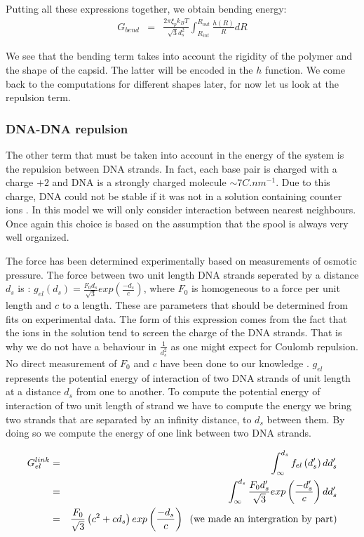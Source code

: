 \documentclass{article}
\begin{document}
Putting all these expressions together, we obtain bending energy:
\begin{eqnarray}
    G_{bend} &=& \frac{2 \pi \xi_p k_B T}{\sqrt{3} d_s^2} \int_{R_{int}}^{R_{out}} \frac{h(R)}{R} dR
\end{eqnarray}

We see that the bending term takes into account the rigidity of the polymer and the shape of the capsid. The latter will be encoded in the $h$ function. We come back to the computations for different shapes later, for now let us look at the repulsion term.

\subsubsection{DNA-DNA repulsion}

The other term that must be taken into account in the energy of the system is the repulsion between DNA strands. In fact, each base pair is charged with a charge $+2$ \cite{alberts2002} and DNA is a strongly charged molecule $ \sim 7 C.nm^{-1} $. Due to this charge, DNA could not be stable if it was not in a solution containing counter ions \cite{singh2015}. In this model we will only consider interaction between nearest neighbours. Once again this choice is based on the assumption that the spool is always very well organized.

The force has been determined experimentally based on measurements of osmotic pressure. The force between two unit length DNA strands seperated by a distance $d_s$ is : $g_{el} \left(d_s\right) = \frac{F_0 d_s}{\sqrt{3}} exp \left(\frac{-d_s}{c}\right) $, where $F_0$ is homogeneous to a force per unit length and $c$ to a length. These are parameters that should be determined from fits on experimental data. The form of this expression comes from the fact that the ions in the solution tend to screen the charge of the DNA strands. That is why we do not have a behaviour in $\frac{1}{d_s^2}$ as one might expect for Coulomb repulsion. No direct measurement of $F_0$ and $c$ have been done to our knowledge \cite{purohit2003}. $g_{el}$ represents the potential energy of interaction of two DNA strands of unit length at a distance $d_s$ from one to another. To compute the potential energy of interaction of two unit length of strand we have to compute the energy we bring two strands that are separated by an infinity distance, to $d_s$ between them. By doing so we compute the energy of one link between two DNA strands.

\begin{eqnarray*}
    G_{el}^{link} &=& \int_{\infty}^{d_s} f_{el} \left( d'_s \right) dd'_s \\
    & = & \int_{\infty}^{d_s} \frac{F_0 d'_s}{\sqrt{3}} exp \left(\frac{-d'_s}{c}\right) dd'_s \\
    & = & \frac{F_0}{\sqrt{3}} \left( c^2 + cd_s \right) exp \left( \frac{- d_s}{c} \right) \;\; \textnormal{(we made an intergration by part)} \label{eq:gelec}
\end{eqnarray*}
\end{document}

